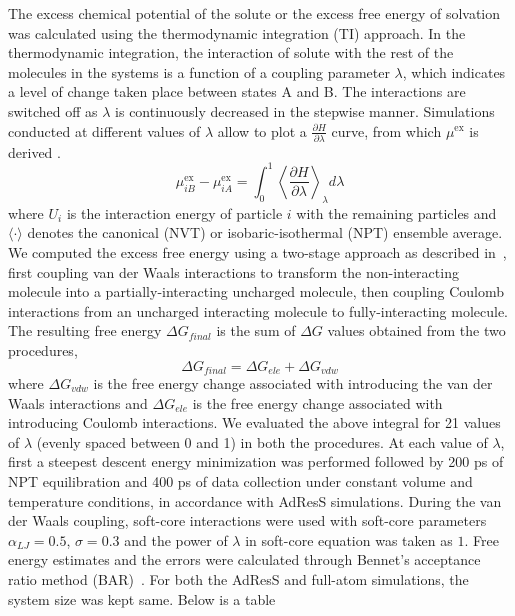 \documentclass[a4paper,preprint,unsortedaddress]{revtex4-1}
\newcommand{\bluec}[1]{{\color{blue} #1}}
\newcommand{\exc}{{\textrm{ex}}}
\begin{document}
The excess chemical potential of the solute or the excess free energy of solvation was calculated using the 
thermodynamic integration (TI) approach. In the thermodynamic integration, the 
interaction of solute with the rest of the molecules in the systems is a function 
of a coupling parameter $\lambda$, which indicates a level of change taken place between states
A and B. The interactions are switched off as $\lambda$ is 
continuously decreased in the stepwise manner. Simulations conducted at different values of 
$\lambda$ allow to plot a $\frac{\partial H}{\partial \lambda}$ curve, from which 
$\mu^{\exc}$ is derived \cite{mu}. 
\begin{equation}
 \mu^\exc_{iB} - \mu^\exc_{iA} = \int_{0}^{1} \left \langle \frac{\partial H}{\partial \lambda} \right \rangle_{\lambda} d\lambda 
\end{equation}
\bluec{where $U_{i}$ is the interaction energy of particle $i$ with the remaining particles} and $\langle \cdot \rangle$
denotes the canonical (NVT) or isobaric-isothermal (NPT) ensemble average. We computed the excess 
free energy using a two-stage approach as described in~\cite{mobley}, first coupling van der Waals interactions to transform the 
non-interacting molecule into a partially-interacting uncharged molecule, then coupling Coulomb
interactions from an uncharged interacting molecule to fully-interacting molecule. The resulting 
free energy $\Delta G_{final}$ is the sum of $\Delta G$ values obtained from the two procedures,
\begin{equation}
 \Delta G_{final} = \Delta G_{ele} + \Delta G_{vdw}
\end{equation}
where $\Delta G_{vdw}$ is the free energy change associated with introducing the van der Waals interactions and 
$\Delta G_{ele}$ is the free energy change associated with introducing Coulomb interactions. 
We evaluated the above integral for 21 values of $\lambda$ (evenly spaced between 0 and 1) in both the procedures.
At each value of $\lambda$, first a steepest descent energy minimization was performed followed 
by 200 ps of NPT equilibration and 400 ps of data collection under constant volume and temperature
conditions, in accordance with AdResS simulations. 
During the van der Waals coupling, soft-core interactions were used with soft-core parameters $\alpha_{LJ} = 0.5$, 
$\sigma = 0.3$ and the power of $\lambda$ in soft-core equation was taken as $1$. Free energy estimates and the errors
were calculated through Bennet's acceptance ratio method (BAR)~\cite{bar}. 
For both the AdResS and full-atom simulations, the system size was kept same. Below is a table 
\end{document}
